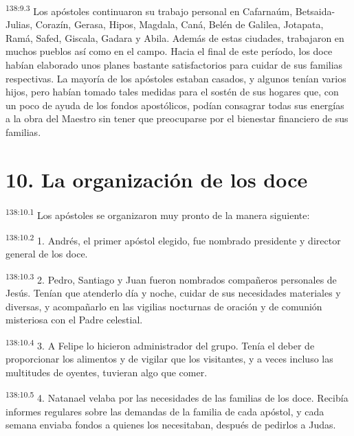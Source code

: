 \par 
\textsuperscript{138:9.3} Los apóstoles continuaron su trabajo personal en Cafarnaúm, Betsaida-Julias, Corazín, Gerasa, Hipos, Magdala, Caná, Belén de Galilea, Jotapata, Ramá, Safed, Giscala, Gadara y Abila. Además de estas ciudades, trabajaron en muchos pueblos así como en el campo. Hacia el final de este período, los doce habían elaborado unos planes bastante satisfactorios para cuidar de sus familias respectivas. La mayoría de los apóstoles estaban casados, y algunos tenían varios hijos, pero habían tomado tales medidas para el sostén de sus hogares que, con un poco de ayuda de los fondos apostólicos, podían consagrar todas sus energías a la obra del Maestro sin tener que preocuparse por el bienestar financiero de sus familias.

\section*{10. La organización de los doce}
\par 
\textsuperscript{138:10.1} Los apóstoles se organizaron muy pronto de la manera siguiente:

\par 
\textsuperscript{138:10.2} 1. Andrés, el primer apóstol elegido, fue nombrado presidente y director general de los doce.

\par 
\textsuperscript{138:10.3} 2. Pedro, Santiago y Juan fueron nombrados compañeros personales de Jesús. Tenían que atenderlo día y noche, cuidar de sus necesidades materiales y diversas, y acompañarlo en las vigilias nocturnas de oración y de comunión misteriosa con el Padre celestial.

\par 
\textsuperscript{138:10.4} 3. A Felipe lo hicieron administrador del grupo. Tenía el deber de proporcionar los alimentos y de vigilar que los visitantes, y a veces incluso las multitudes de oyentes, tuvieran algo que comer.

\par 
\textsuperscript{138:10.5} 4. Natanael velaba por las necesidades de las familias de los doce. Recibía informes regulares sobre las demandas de la familia de cada apóstol, y cada semana enviaba fondos a quienes los necesitaban, después de pedirlos a Judas.

